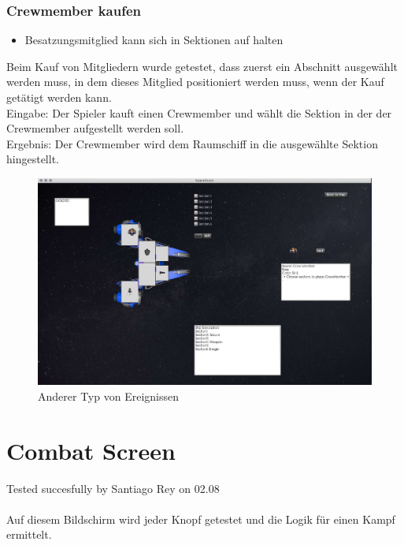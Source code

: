 \documentclass[12pt]{article}
\begin{document}
\subsubsection{Crewmember kaufen}
\begin{itemize}
\item Besatzungsmitglied kann sich in Sektionen auf halten
\end{itemize}
Beim Kauf von Mitgliedern wurde getestet, dass zuerst ein Abschnitt ausgewählt werden muss, in dem dieses Mitglied positioniert werden muss, wenn der Kauf getätigt werden kann.\\
Eingabe: Der Spieler kauft einen Crewmember und wählt die Sektion in der der Crewmember aufgestellt werden soll.\\
Ergebnis: Der Crewmember wird dem Raumschiff in die ausgewählte Sektion hingestellt.\\
\begin{figure}[htp]
\centering
\includegraphics[scale=0.4]{TestProtocolBilder/crewmemberkaufen.jpg}
\caption{Anderer Typ von Ereignissen}
\end{figure}


\newpage
\section{Combat Screen}
Tested succesfully by Santiago Rey on 02.08\\\\
Auf diesem Bildschirm wird jeder Knopf getestet und die Logik für einen Kampf ermittelt.
\end{document}
